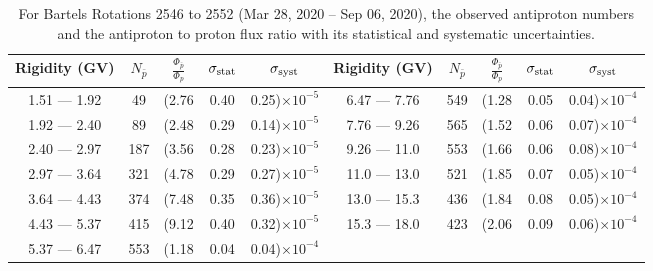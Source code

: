 \begin{table}[p] 
\renewcommand\baselinestretch{1.3}\selectfont
\setlength\tabcolsep{3pt}
\centering
\begin{tabular}{ccccc | ccccc}
\hline
\textbf{Rigidity}  (GV)  & $N_{\bar{p}}$ & $\frac{\Phi_{\bar{p}}}{\Phi_{p}}$ & $\sigma_{\rm{stat}}$ & $\sigma_{\rm{syst}}$ \hspace{1cm}   & \textbf{Rigidity}  (GV)  & $N_{\bar{p}}$ & $\frac{\Phi_{\bar{p}}}{\Phi_{p}}$ & $\sigma_{\rm{stat}}$ & $\sigma_{\rm{syst}}$ \hspace{1cm} \\ 
\hline
1.51 — 1.92   &  49                  &(2.76                          &  0.40              &      0.25)$\times 10^{-5}$  & 6.47 — 7.76                &  549                    &(1.28                                &  0.05                   &      0.04)$\times 10^{-4}$\\
1.92 — 2.40   &  89                  &(2.48                          &  0.29              &      0.14)$\times 10^{-5}$  & 7.76 — 9.26                &  565                    &(1.52                                &  0.06                   &      0.07)$\times 10^{-4}$\\
2.40 — 2.97   &  187                &(3.56                          &  0.28              &      0.23)$\times 10^{-5}$  & 9.26 — 11.0                &  553                    &(1.66                                &  0.06                   &      0.08)$\times 10^{-4}$\\    
2.97 — 3.64   &  321                &(4.78                          &  0.29              &      0.27)$\times 10^{-5}$  & 11.0 — 13.0                 &  521                   &(1.85                                &  0.07                   &      0.05)$\times 10^{-4}$\\    
3.64 — 4.43   &  374                &(7.48                          &  0.35              &      0.36)$\times 10^{-5}$  & 13.0 — 15.3               &  436                    &(1.84                                &  0.08                   &      0.05)$\times 10^{-4}$\\
4.43 — 5.37   &  415                &(9.12                          &  0.40              &      0.32)$\times 10^{-5}$  & 15.3 — 18.0               &  423                    &(2.06                                &  0.09                   &      0.06)$\times 10^{-4}$\\
5.37 — 6.47   &  553                &(1.18                          &  0.04              &      0.04)$\times 10^{-4}$  & \\
\hline
\end{tabular}
\caption[Antiproton to proton flux ratio for Bartels Rotations 2546 to 2552]{For Bartels Rotations 2546 to 2552 (Mar 28, 2020 – Sep 06, 2020), the observed antiproton numbers and the antiproton to proton flux ratio with its statistical and systematic uncertainties.}
\label{TableOfDependent21}
\end{table}

